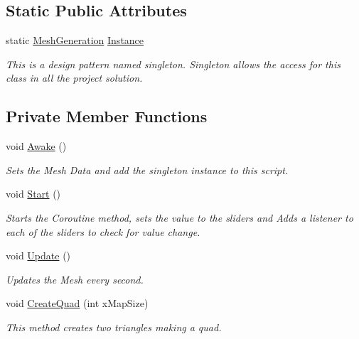 \subsection*{Static Public Attributes}
\begin{DoxyCompactItemize}
\item 
\mbox{\label{class_assets_1_1_scripts_1_1_mesh_generation_adb4b46217e97f7f7e8ca3aafdb8e72cd}} 
static \mbox{\hyperlink{class_assets_1_1_scripts_1_1_mesh_generation}{Mesh\+Generation}} \mbox{\hyperlink{class_assets_1_1_scripts_1_1_mesh_generation_adb4b46217e97f7f7e8ca3aafdb8e72cd}{Instance}}
\begin{DoxyCompactList}\small\item\em This is a design pattern named singleton. Singleton allows the access for this class in all the project solution. \end{DoxyCompactList}\end{DoxyCompactItemize}
\subsection*{Private Member Functions}
\begin{DoxyCompactItemize}
\item 
void \mbox{\hyperlink{class_assets_1_1_scripts_1_1_mesh_generation_a30849dcee23c658732c99ad36d84dc58}{Awake}} ()
\begin{DoxyCompactList}\small\item\em Sets the Mesh Data and add the singleton instance to this script. \end{DoxyCompactList}\item 
void \mbox{\hyperlink{class_assets_1_1_scripts_1_1_mesh_generation_a41b690987228c88da57a68df85864fb8}{Start}} ()
\begin{DoxyCompactList}\small\item\em Starts the Coroutine method, sets the value to the sliders and Adds a listener to each of the sliders to check for value change. \end{DoxyCompactList}\item 
void \mbox{\hyperlink{class_assets_1_1_scripts_1_1_mesh_generation_a4cb917bfef5c78eba6e24157eb187e4d}{Update}} ()
\begin{DoxyCompactList}\small\item\em Updates the Mesh every second. \end{DoxyCompactList}\item 
void \mbox{\hyperlink{class_assets_1_1_scripts_1_1_mesh_generation_a62d43347495810972a55224a8ff7a7a1}{Create\+Quad}} (int x\+Map\+Size)
\begin{DoxyCompactList}\small\item\em This method creates two triangles making a quad. \end{DoxyCompactList}\end{DoxyCompactItemize}
